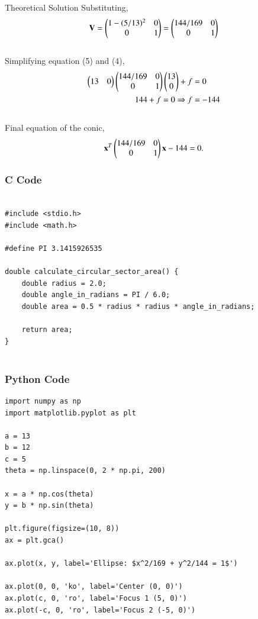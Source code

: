 \documentclass{beamer}
\begin{document}
\begin{frame}{Theoretical Solution}
Substituting,
\begin{align}
    \mathbf{V} = \begin{pmatrix}1 - (5/13)^2 & 0 \\ 0 & 1\end{pmatrix} = \begin{pmatrix}144/169 & 0 \\ 0 & 1\end{pmatrix}
\end{align}
\\

Simplifying equation (5) and (4),
\begin{align}
    \begin{pmatrix}13 & 0\end{pmatrix} \begin{pmatrix}144/169 & 0 \\ 0 & 1\end{pmatrix} \begin{pmatrix}13 \\ 0\end{pmatrix} + f &= 0 \nonumber \\
    144 + f = 0 \Rightarrow f &= -144
\end{align}
\\

Final equation of the conic,
\begin{align*}
\mathbf{x}^T \begin{pmatrix}144/169 & 0 \\ 0 & 1\end{pmatrix} \mathbf{x} - 144 = 0.
\end{align*}
\end{frame}

\begin{frame}[fragile]
    \frametitle{C Code}

    \begin{lstlisting}

#include <stdio.h>
#include <math.h>

#define PI 3.1415926535

double calculate_circular_sector_area() {
    double radius = 2.0;
    double angle_in_radians = PI / 6.0;
    double area = 0.5 * radius * radius * angle_in_radians;
    
    return area;
}


    \end{lstlisting}
\end{frame}


\begin{frame}[fragile]
    \frametitle{Python Code}
    \begin{lstlisting}
import numpy as np
import matplotlib.pyplot as plt

a = 13
b = 12
c = 5
theta = np.linspace(0, 2 * np.pi, 200)

x = a * np.cos(theta)
y = b * np.sin(theta)

plt.figure(figsize=(10, 8))
ax = plt.gca()

ax.plot(x, y, label='Ellipse: $x^2/169 + y^2/144 = 1$')

ax.plot(0, 0, 'ko', label='Center (0, 0)')
ax.plot(c, 0, 'ro', label='Focus 1 (5, 0)')
ax.plot(-c, 0, 'ro', label='Focus 2 (-5, 0)')


    \end{lstlisting}
\end{frame}
\end{document}
